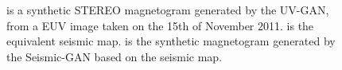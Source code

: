 \documentclass[11pt,a4paper,onecolumn]{report}
\begin{document}
\begin{figure}[t]%
  \centering
  \caption[]{ is a synthetic STEREO magnetogram
  generated by the UV-GAN, from a EUV image taken on the 15th of November 2011.
   is the equivalent seismic map.
   is the synthetic magnetogram generated by the
  Seismic-GAN based on the seismic map.}
  \label{fig:seismic_2011_11_15}
\end{figure}
\end{document}
